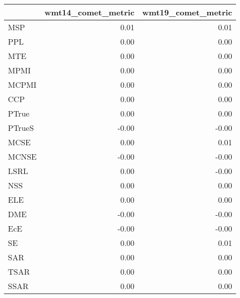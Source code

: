 \begin{tabular}{lrr}
\toprule
 & wmt14\_comet\_metric & wmt19\_comet\_metric \\
\midrule
MSP & 0.01 & 0.01 \\
PPL & 0.00 & 0.00 \\
MTE & 0.00 & 0.00 \\
MPMI & 0.00 & 0.00 \\
MCPMI & 0.00 & 0.00 \\
CCP & 0.00 & 0.00 \\
PTrue & 0.00 & 0.00 \\
PTrueS & -0.00 & -0.00 \\
MCSE & 0.00 & 0.01 \\
MCNSE & -0.00 & -0.00 \\
LSRL & 0.00 & -0.00 \\
NSS & 0.00 & 0.00 \\
ELE & 0.00 & 0.00 \\
DME & -0.00 & -0.00 \\
EcE & -0.00 & -0.00 \\
SE & 0.00 & 0.01 \\
SAR & 0.00 & 0.00 \\
TSAR & 0.00 & 0.00 \\
SSAR & 0.00 & 0.00 \\
\bottomrule
\end{tabular}
